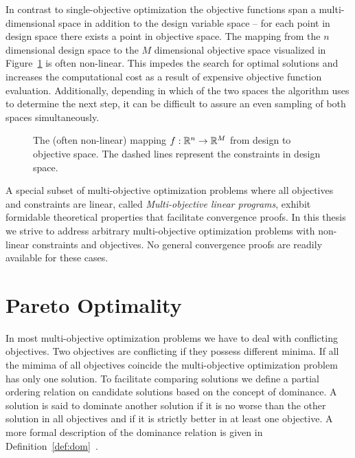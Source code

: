 In contrast to single-objective optimization the objective functions span
  a multi-dimensional space in addition to the design variable space --
  for each point in design space there exists a point in objective space.
The mapping from the $n$ dimensional design space to the $M$ dimensional
  objective space visualized in Figure~\ref{fig:des_to_obj} is often
  non-linear.
This impedes the search for optimal solutions and increases the computational
  cost as a result of expensive objective function evaluation.
Additionally, depending in which of the two spaces the algorithm uses to
  determine the next step, it can be difficult to assure an even sampling of
  both spaces simultaneously.
%
\begin{figure}
  \begin{center}
    \begin{tikzpicture}
%      
    \end{tikzpicture}
  \end{center}
  \caption{The (often non-linear) mapping $f : \R^n \rightarrow
    \R^M$ from design to objective space. The dashed lines represent
    the constraints in design space.
    }
  \label{fig:des_to_obj}
\end{figure}

A special subset of multi-objective optimization problems where all objectives
  and constraints are linear, called \textit{Multi-objective linear programs},
  exhibit formidable theoretical properties that facilitate convergence proofs.
In this thesis we strive to address arbitrary multi-objective optimization
  problems with non-linear constraints and objectives.
No general convergence proofs are readily available for these cases.


\section{Pareto Optimality}

In most multi-objective optimization problems we have to deal with conflicting
  objectives.
Two objectives are conflicting if they possess different minima.
If all the mimima of all objectives coincide the multi-objective optimization
  problem has only one solution.
To facilitate comparing solutions we define a partial ordering relation on
  candidate solutions based on the concept of dominance.
A solution is said to dominate another solution if it is no worse than the
  other solution in all objectives and if it is strictly better in at least
  one objective.
A more formal description of the dominance relation is given in
  Definition~\ref{def:dom}~\cite{deb:09}.

